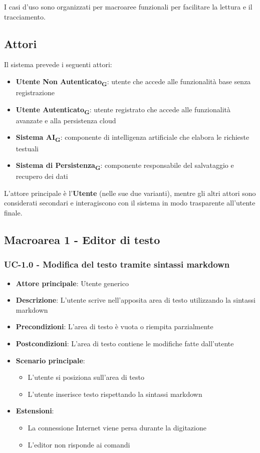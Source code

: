\documentclass[11pt,a4paper]{article}
\begin{document}
I casi d'uso sono organizzati per macroaree funzionali per facilitare la lettura e il tracciamento.

\subsection{Attori}
Il sistema prevede i seguenti attori:

\begin{itemize}
    \item \textbf{Utente Non Autenticato\textsubscript{G}}: utente che accede alle funzionalità base senza registrazione
    \item \textbf{Utente Autenticato\textsubscript{G}}: utente registrato che accede alle funzionalità avanzate e alla persistenza cloud
    \item \textbf{Sistema AI\textsubscript{G}}: componente di intelligenza artificiale che elabora le richieste testuali
    \item \textbf{Sistema di Persistenza\textsubscript{G}}: componente responsabile del salvataggio e recupero dei dati
\end{itemize}

L'attore principale è l'\textbf{Utente} (nelle sue due varianti), mentre gli altri attori sono considerati secondari e interagiscono con il sistema in modo trasparente all'utente finale.

\newpage

\subsection{Macroarea 1 - Editor di testo}
\subsubsection{UC-1.0 - Modifica del testo tramite sintassi markdown}
\begin{itemize}
    \item \textbf{Attore principale}: Utente generico
    \item \textbf{Descrizione}: L’utente scrive nell’apposita area di testo utilizzando la sintassi markdown
    \item \textbf{Precondizioni}: L’area di testo è vuota o riempita parzialmente
    \item \textbf{Postcondizioni}: L’area di testo contiene le modifiche fatte dall’utente
    \item \textbf{Scenario principale}:
        \begin{itemize}
            \item L’utente si posiziona sull’area di testo
            \item L’utente inserisce testo rispettando la sintassi markdown
        \end{itemize}
    \item \textbf{Estensioni}:
        \begin{itemize}
            \item La connessione Internet viene persa durante la digitazione
            \item L'editor non risponde ai comandi
        \end{itemize}
\end{itemize}
\end{document}
